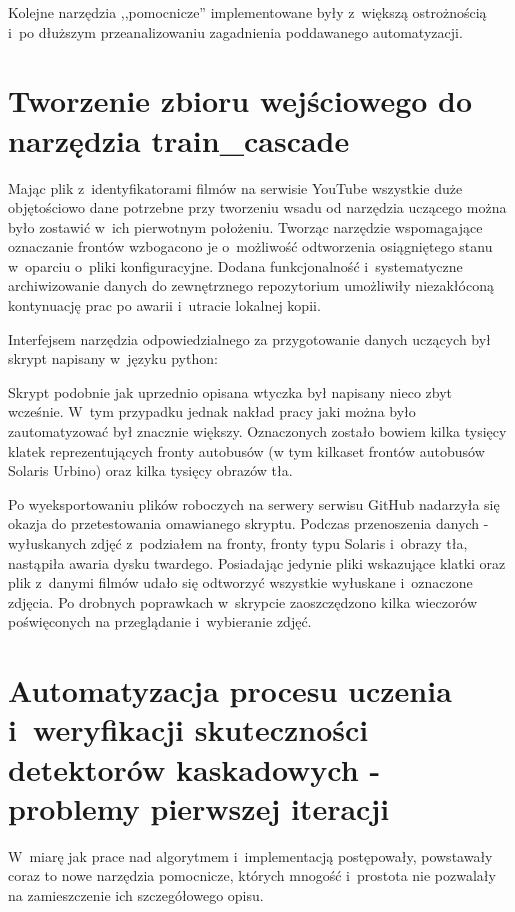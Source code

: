 Kolejne narzędzia ,,pomocnicze'' implementowane były z~większą 
ostrożnością i~po
dłuższym przeanalizowaniu zagadnienia poddawanego automatyzacji.

\section{Tworzenie zbioru wejściowego do narzędzia train\_cascade}

Mając plik z~identyfikatorami filmów na serwisie YouTube wszystkie duże objętościowo
dane potrzebne przy tworzeniu wsadu od narzędzia uczącego można było zostawić
w~ich pierwotnym położeniu. Tworząc narzędzie wspomagające oznaczanie frontów
wzbogacono je o~możliwość odtworzenia osiągniętego stanu w~oparciu o~pliki konfiguracyjne.
Dodana funkcjonalność i~systematyczne archiwizowanie danych do zewnętrznego repozytorium
umożliwiły niezakłóconą kontynuację prac po awarii i~utracie lokalnej kopii.

Interfejsem narzędzia odpowiedzialnego za przygotowanie danych uczących był skrypt
napisany w~języku python:



Skrypt podobnie jak uprzednio opisana wtyczka był napisany 
nieco zbyt wcześnie. W~tym przypadku jednak nakład pracy jaki 
można było zautomatyzować był znacznie większy. Oznaczonych zostało 
bowiem kilka tysięcy klatek reprezentujących fronty autobusów
(w tym kilkaset frontów autobusów Solaris Urbino) oraz kilka tysięcy
obrazów tła. 

Po wyeksportowaniu plików roboczych na serwery serwisu GitHub
nadarzyła się okazja do przetestowania omawianego skryptu.
Podczas przenoszenia danych - wyłuskanych 
zdjęć z~podziałem na fronty, fronty typu Solaris i~obrazy tła, nastąpiła awaria dysku
twardego. Posiadając jedynie pliki wskazujące klatki oraz plik 
z~danymi filmów udało się odtworzyć wszystkie wyłuskane i~oznaczone
zdjęcia. Po drobnych poprawkach w~skrypcie zaoszczędzono kilka wieczorów
poświęconych na przeglądanie i~wybieranie zdjęć.

\section{Automatyzacja procesu uczenia i~weryfikacji skuteczności
    detektorów kaskadowych - problemy pierwszej iteracji}

W~miarę jak prace nad algorytmem i~implementacją postępowały, powstawały
coraz to nowe narzędzia pomocnicze, których mnogość i~prostota nie
pozwalały na zamieszczenie ich szczegółowego opisu. 

